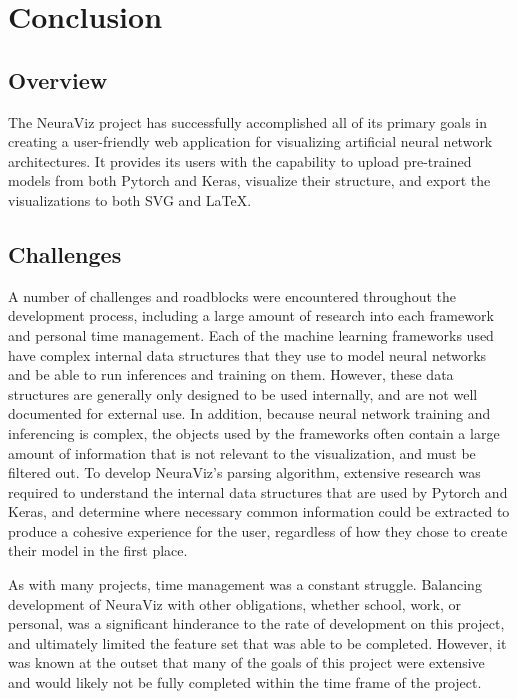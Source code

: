 \section{Conclusion}																	
\label{sec:Conclusion}

\subsection{Overview} 
The NeuraViz project has successfully accomplished all of its primary goals in creating a user-friendly web application for visualizing artificial neural network architectures. It provides its users with the capability to upload pre-trained models from both Pytorch and Keras, visualize their structure, and export the visualizations to both SVG and LaTeX.

\subsection{Challenges}
A number of challenges and roadblocks were encountered throughout the development process, including a large amount of research into each framework and personal time management. Each of the machine learning frameworks used have complex internal data structures that they use to model neural networks and be able to run inferences and training on them. However, these data structures are generally only designed to be used internally, and are not well documented for external use. In addition, because neural network training and inferencing is complex, the objects used by the frameworks often contain a large amount of information that is not relevant to the visualization, and must be filtered out. To develop NeuraViz's parsing algorithm, extensive research was required to understand the internal data structures that are used by Pytorch and Keras, and determine where necessary common information could be extracted to produce a cohesive experience for the user, regardless of how they chose to create their model in the first place.

As with many projects, time management was a constant struggle. Balancing development of NeuraViz with other obligations, whether school, work, or personal, was a significant hinderance to the rate of development on this project, and ultimately limited the feature set that was able to be completed. However, it was known at the outset that many of the goals of this project were extensive and would likely not be fully completed within the time frame of the project.

